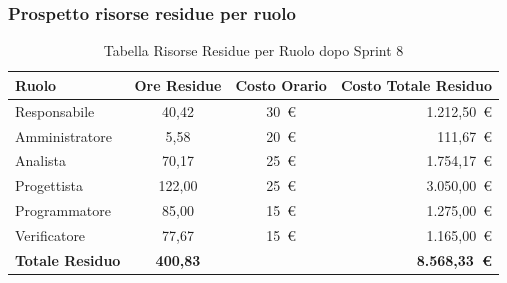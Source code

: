 \subsubsection{Prospetto risorse residue per ruolo}
\begin{table}[H]
    \centering
    \renewcommand{\arraystretch}{1.3}
    \begin{tabularx}{\textwidth}{|X|c|c|r|}
        \hline
        \textbf{Ruolo} & \textbf{Ore Residue} & \textbf{Costo Orario} &
        \textbf{Costo Totale Residuo} \\
        \hline
        Responsabile   & 40,42 & 30~\euro & 1.212{,}50~\euro \\
        Amministratore & 5,58 & 20~\euro &   111{,}67~\euro \\
        Analista       & 70,17 & 25~\euro & 1.754{,}17~\euro \\
        Progettista    & 122,00 & 25~\euro & 3.050{,}00~\euro \\
        Programmatore  & 85,00 & 15~\euro & 1.275{,}00~\euro \\
        Verificatore   & 77,67 & 15~\euro & 1.165{,}00~\euro \\
        \hline
        \textbf{Totale Residuo} & \textbf{400,83} & &
        \textbf{8.568{,}33~\euro} \\
        \hline
    \end{tabularx}
    \caption{Tabella Risorse Residue per Ruolo dopo Sprint 8}
\end{table}

